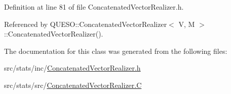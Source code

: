 Definition at line 81 of file Concatenated\-Vector\-Realizer.\-h.



Referenced by Q\-U\-E\-S\-O\-::\-Concatenated\-Vector\-Realizer$<$ V, M $>$\-::\-Concatenated\-Vector\-Realizer().



The documentation for this class was generated from the following files\-:\begin{DoxyCompactItemize}
\item 
src/stats/inc/\hyperlink{_concatenated_vector_realizer_8h}{Concatenated\-Vector\-Realizer.\-h}\item 
src/stats/src/\hyperlink{_concatenated_vector_realizer_8_c}{Concatenated\-Vector\-Realizer.\-C}\end{DoxyCompactItemize}
